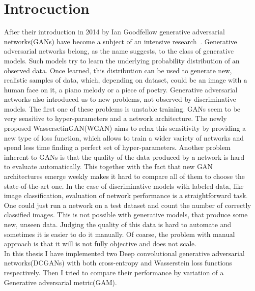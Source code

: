 \section{Introcuction}
After their introduction in 2014 by Ian Goodfellow generative adversarial networks(GANs) have become a subject of an intensive research~\citep{gan}. Generative adversarial networks belong, as the name suggests, to the class of generative models. Such models try to learn the underlying probability distribution of an observed data. Once learned, this distribution can be used to generate new, realistic samples of data, which, depending on dataset, could be an image with a human face on it, a piano melody or a piece of poetry. Generative adversarial networks also introduced us to new problems, not observed by discriminative models. The first one of these problems is unstable training. GANs seem to be very sensitive to hyper-parameters and a network architecture. The newly proposed WassersetinGAN(WGAN) aims to relax this sensitivity by providing a new type of loss function, which allows to train a wider variety of networks and spend less time finding a perfect set of hyper-parameters. Another problem inherent to GANs is that the quality of the data produced by a network is hard to evaluate automatically. This together with the fact that new GAN architectures emerge weekly makes it hard to compare all of them to choose the state-of-the-art one. In the case of discriminative models with labeled data, like image classification, evaluation of network performance is a straightforward task. One could just run a network on a test dataset and count the number of correctly classified images. This is not possible with generative models, that produce some new, unseen data. Judging the quality of this data is hard to automate and sometimes it is easier to do it manually. Of coarse, the problem with manual approach is that it will is not fully objective and does not scale.\\ 
\indent In this thesis I have implemented two Deep convolutional generative adversarial networks(DCGANs) with both cross-entropy and Wasserstein loss functions respectively. Then I tried to compare their performance by variation of a Generative adversarial metric(GAM). 